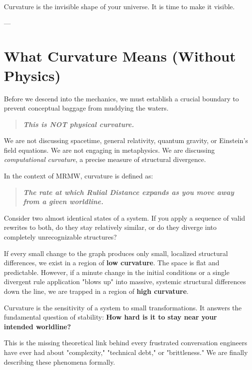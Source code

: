Curvature is the invisible shape of your universe. It is time to make it visible.

---

\section{\texorpdfstring{\textbf{What Curvature Means (Without Physics)}}{9.1 --- What Curvature Means (Without Physics)}}

Before we descend into the mechanics, we must establish a crucial boundary to prevent conceptual baggage from muddying the waters.

\begin{quote}
\itshape
\textbf{\textit{This is NOT physical curvature.}}
\end{quote}

We are not discussing spacetime, general relativity, quantum gravity, or Einstein's field equations. We are not engaging in metaphysics. We are discussing \textit{computational curvature}, a precise measure of structural divergence.

In the context of MRMW, curvature is defined as:

\begin{quote}
\itshape
\textbf{The rate at which Rulial Distance expands as you move away from a given worldline.}
\end{quote}

Consider two almost identical states of a system. If you apply a sequence of valid rewrites to both, do they stay relatively similar, or do they diverge into completely unrecognizable structures?

If every small change to the graph produces only small, localized structural differences, we exist in a region of \textbf{low curvature}. The space is flat and predictable. However, if a minute change in the initial conditions or a single divergent rule application "blows up" into massive, systemic structural differences down the line, we are trapped in a region of \textbf{high curvature}.

Curvature is the sensitivity of a system to small transformations. It answers the fundamental question of stability: \textbf{How hard is it to stay near your intended worldline?}

This is the missing theoretical link behind every frustrated conversation engineers have ever had about "complexity," "technical debt," or "brittleness." We are finally describing these phenomena formally.

